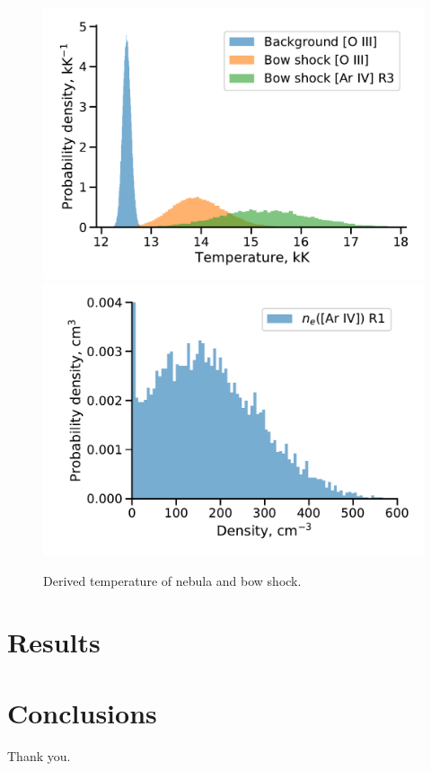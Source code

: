 \documentclass[twocolumn, times]{aastex631}
\begin{document}
\begin{figure}
  \centering
  \includegraphics[width=\linewidth]{figs/ngc346-bowshock-T-oiii-ariv}
  \includegraphics[width=\linewidth]{figs/ngc346-bowshock-den-ariv}
  \caption{
    Derived temperature of nebula and bow shock. 
    }
  \label{fig:T-oiii-ariv}
\end{figure}




\section{Results}
\label{sec:results}





\section{Conclusions}
\label{sec:conclusions}

\begin{acknowledgments}
  Thank you.
\end{acknowledgments}



\end{document}
